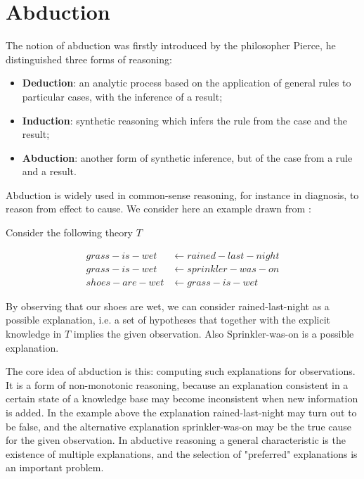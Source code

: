\section{Abduction} \label{seq:intro}
The notion of abduction was firstly introduced by the philosopher Pierce, he distinguished three forms of reasoning:

\begin{itemize}
    \item \textbf{Deduction}: an analytic process based on the application of general rules to particular cases, with the inference of a result;
    \item \textbf{Induction}: synthetic reasoning which infers the rule from the case and the result;
    \item \textbf{Abduction}: another form of synthetic inference, but of the case from a rule and a result.
\end{itemize}

Abduction is widely used in common-sense reasoning, for instance in diagnosis, 
to reason from effect to cause. We consider here an example drawn from \cite{kakas1992abductive}:

Consider the following theory \(T\)

\begin{align*} 
grass-is-wet &\leftarrow  rained-last-night \\
grass-is-wet &\leftarrow sprinkler-was-on \\
shoes-are-wet &\leftarrow grass-is-wet
\end{align*}


By observing that our shoes are wet, we can consider rained-last-night as a possible explanation, 
i.e. a set of hypotheses that together with the explicit knowledge in \(T\) implies the given observation. 
Also Sprinkler-was-on is a possible explanation.

The core idea of abduction is this: computing such explanations for observations. 
It is a form of non-monotonic reasoning, because an explanation consistent in a certain state of a knowledge base may become inconsistent when new information is added. 
In the example above the explanation rained-last-night may turn out to be false, 
and the alternative explanation sprinkler-was-on may be the true cause for the given observation. 
In abductive reasoning a general characteristic is the existence of multiple explanations, and the selection of "preferred" explanations is an important problem.

